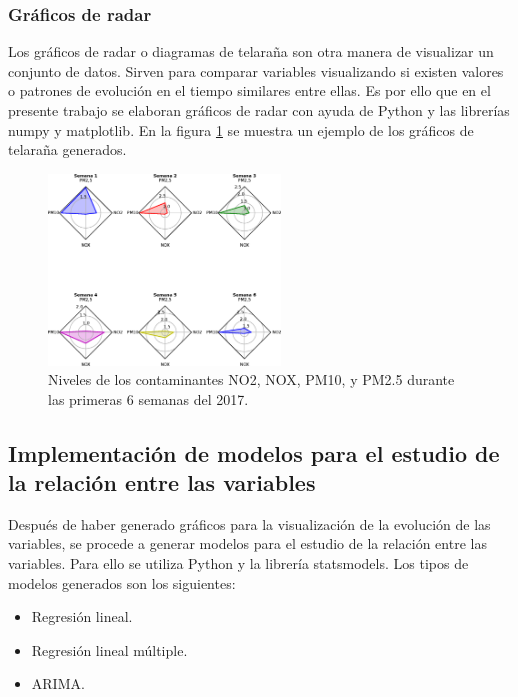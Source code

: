 \subsubsection{Gráficos de radar}
Los gráficos de radar o diagramas de telaraña son otra manera de visualizar un conjunto de datos. Sirven para comparar variables visualizando si existen valores o patrones de evolución en el tiempo similares entre ellas. Es por ello que en el presente trabajo se elaboran gráficos de radar con ayuda de Python y las librerías numpy y matplotlib. En la figura \ref{grafico_de_telaraña} se muestra un ejemplo de los gráficos de telaraña generados.
\begin{figure}[h!]
\setcounter{figure}{1} %
\captionsetup{type=figure} %
\begin{center}
   \includegraphics[width=0.55\textwidth]{Contaminantes-2017.eps}
   \end{center}
    \caption{Niveles de los contaminantes NO2, NOX, PM10, y PM2.5 durante las primeras 6 semanas del 2017.}
    \label{grafico_de_telaraña}
\end{figure}

\subsection{Implementación de modelos para el estudio de la relación entre las variables}
Después de haber generado gráficos para la visualización de la evolución de las variables, se procede a generar modelos para el estudio de la relación entre las variables. Para ello se utiliza Python y la librería statsmodels. Los tipos de modelos generados son los siguientes:
\begin{itemize}
	\item Regresión lineal.
	\item Regresión lineal múltiple.
	\item ARIMA.
\end{itemize}

